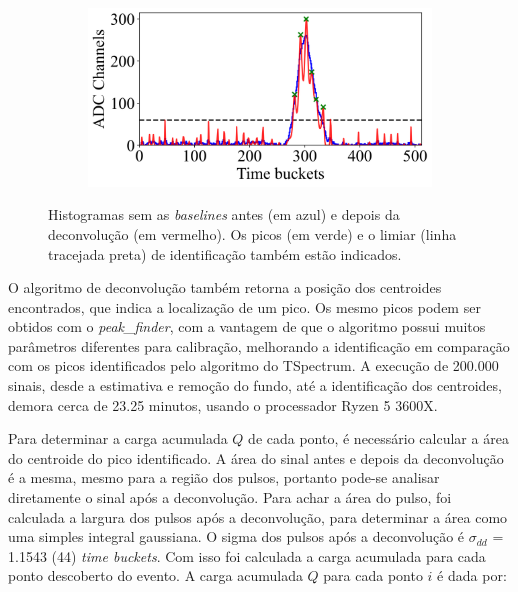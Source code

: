 \documentclass[a4paper,12pt,oneside]{book}
\begin{document}
\begin{figure}[H]
\begin{subfigure}[b]{0.48\textwidth}
        \caption{}
        \label{subfig:ex_sinal_deconv_3}
    \end{subfigure}%
    \hfill
    \begin{subfigure}[b]{0.48\textwidth}
        \centering
        \includegraphics[scale=0.40]{figs/ex_deconv_4.png}
        \caption{}
        \label{subfig:ex_sinal_deconv_4}
    \end{subfigure}
\caption{Histogramas sem as \textit{baselines} antes (em azul) e depois da deconvolução (em vermelho). Os picos (em verde) e o limiar (linha tracejada preta) de identificação também estão indicados.}
\label{fig:ex_sinal_deconv}
\end{figure}

\par O algoritmo de deconvolução também retorna a posição dos centroides encontrados, que indica a localização de um pico. Os mesmo picos podem ser obtidos com o \textit{peak\_finder}, com a vantagem de que o algoritmo possui muitos parâmetros diferentes para calibração, melhorando a identificação em comparação com os picos identificados pelo algoritmo do TSpectrum. A execução de 200.000 sinais, desde a estimativa e remoção do fundo, até a identificação dos centroides, demora cerca de 23.25 minutos, usando o processador Ryzen 5 3600X.

\par Para determinar a carga acumulada $Q$ de cada ponto, é necessário calcular a área do centroide do pico identificado. A área do sinal antes e depois da deconvolução é a mesma, mesmo para a região dos pulsos, portanto pode-se analisar diretamente o sinal após a deconvolução. Para achar a área do pulso, foi calculada a largura dos pulsos após a deconvolução, para determinar a área como uma simples integral gaussiana. O sigma dos pulsos após a deconvolução é $\sigma_{dd}$ = 1.1543 (44) \textit{time buckets}. Com isso foi calculada a carga acumulada para cada ponto descoberto do evento. A carga acumulada $Q$ para cada ponto $i$ é dada por:
\end{document}
